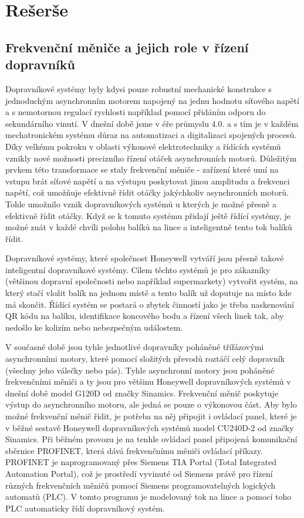 \chapter{Rešerše} \label{chap:Rešerše}
\section{Frekvenční měniče a jejich role v řízení dopravníků}\label{sec:FrekvencniMeniceAJejichRole}

Dopravníkové systémy byly kdysi pouze robustní mechanické konstrukce s jednoduchým asynchronním motorem napojený na jednu hodnotu síťového napětí a s nemotornou regulací rychlosti například pomocí přidáním odporu do sekundárního vinutí. V dnešní době jsme v éře průmyslu 4.0. a s tím je v každém mechatronickém systému důraz na automatizaci a digitalizaci spojených procesů. Díky velkému pokroku v oblasti výkonové elektrotechniky a řídících systémů vznikly nové možnosti precizního řízení otáček asynchronních motorů. Důležitým prvkem této transformace se staly frekvenční měniče - zařízení které umí na vstupu brát síťové napětí a na výstupu poskytovat jinou amplitudu a frekvenci napětí, což umožňuje efektivně řídit otáčky jakýchkoliv asynchronních motorů. Tohle umožnilo vznik dopravníkových systémů u kterých je možné přesně a efektivně řídit otáčky. Když se k tomuto systému přidají ještě řídící systémy, je možné znát v každé chvíli polohu balíků na lince a inteligentně tento tok balíků řídit.

Dopravníkové systémy, které společnost Honeywell vytváří jsou přesně takové inteligentní dopravníkové systémy. Cílem těchto systémů je pro zákazníky (většinou dopravní společnosti nebo například supermarkety) vytvořit systém, na který stačí vložit balík na jednom místě a tento balík už doputuje na místo kde má skončit. Řídící systém se postará o zbytek činností jako je třeba naskenování QR kódu na balíku, identifikace koncového bodu a řízení všech linek tak, aby nedošlo ke kolizím nebo nebezpečným událostem.

V současné době jsou tyhle jednotlivé dopravníky poháněné třífázovými asynchronními motory, které pomocí složitých převodů roztáčí celý dopravník (všechny jeho válečky nebo pás). Tyhle asynchronní motory jsou poháněné frekvenčními měniči a ty jsou pro většinu Honeywell dopravníkových systémů v dnešní době model G120D od značky Sinamics. Frekvenční měnič poskytuje výstup do asynchronního motoru, ale jedná se pouze o výkonovou část. Aby bylo možné frekvenční měnič řídit, je potřeba na něj připojit i ovládací panel, které je v běžné sestavě Honeywell dopravníkových systémů model CU240D-2 od značky Sinamics. Při běžném provozu je na tenhle ovládací panel připojená komunikační sběrnice PROFINET, která dává frekvenčnímu měniči ovládací příkazy. PROFINET je naprogramovaný přes Siemens TIA Portal (Total Integrated Automation Portal), což je prostředí vyvinuté od Siemens právě pro řízení různých frekvenčních měničů pomocí Siemens programovatelných logických automatů (PLC). V tomto programu je modelovaný tok na lince a pomocí toho PLC automaticky řídí dopravníkový systém.
\cite{SinamicsG120D}

